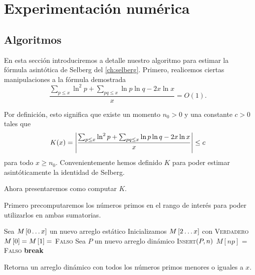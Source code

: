 \setlength{\headheight}{14.61858pt}
\pagestyle{fancy}

\chapter[Experimentaci\'on num\'erica]
{Experimentaci\'on num\'erica}
\label{ch:algorithms}

\vspace*{1cm}

\section{Algoritmos}
En esta secci\'on introduciremos a detalle nuestro algoritmo
para estimar la f\'ormula asint\'otica de Selberg del \cref{ch:selberg}.
Primero, realicemos ciertas manipulaciones a la f\'ormula demostrada
\[
  \frac{\sum_{p \leq x} \ln^2 p + \sum_{pq \leq x} \ln p \ln q - 2x\ln x}{x} = O(1).
\]

Por definici\'on, esto significa que existe
un momento \(n_0 > 0\)
y una constante \(c > 0\)
tales que
\[
  K(x)
  = \left\lvert \frac{\sum_{p \leq x} \ln^2 p
  + \sum_{pq \leq x} \ln p \ln q
  - 2x\ln x}{x} \right\rvert
  \leq c
\]
para todo \(x \geq n_0\).
Convenientemente hemos definido \(K\)
para poder estimar asint\'oticamente la identidad de Selberg.

Ahora presentaremos como computar \(K\).

Primero precomputaremos los n\'umeros primos en el rango de inter\'es
para poder utilizarlos en ambas sumatorias.

\begin{algorithm}[H]
    \SetAlgoLined
    \DontPrintSemicolon
     {
        Sea \(M\left[ 0 \dots x \right]\) un nuevo arreglo est\'atico\;
        Inicializamos \(M\left[ 2 \dots x \right]\) con \textsc{Verdadero}\;
        \(M\left[ 0 \right] = M\left[ 1 \right] = \) \textsc{Falso}\;
        Sea \(P\) un nuevo arreglo din\'amico\;
         {
             {
                \textsc{Insert}\(\left( P, n \right)\)\;
            }
             {
                \(M[np]\) = \textsc{Falso}\;
                 {
                    \textbf{break}\;
                }
            }
        }
    }
    \caption{Retorna un arreglo din\'amico con todos los n\'umeros primos menores o iguales a \(x\).}
\end{algorithm}

